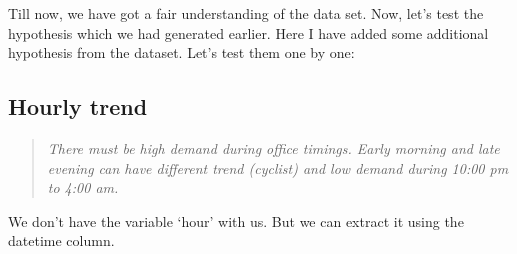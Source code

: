 \documentclass[]{book}
\newenvironment{Shaded}{\begin{snugshade}}{\end{snugshade}}
\newcommand{\CommentTok}[1]{\textcolor[rgb]{0.56,0.35,0.01}{\textit{#1}}}
\newcommand{\DecValTok}[1]{\textcolor[rgb]{0.00,0.00,0.81}{#1}}
\newcommand{\KeywordTok}[1]{\textcolor[rgb]{0.13,0.29,0.53}{\textbf{#1}}}
\newcommand{\NormalTok}[1]{#1}
\newcommand{\OperatorTok}[1]{\textcolor[rgb]{0.81,0.36,0.00}{\textbf{#1}}}
\begin{document}
Till now, we have got a fair understanding of the data set. Now, let's test the hypothesis which we had generated earlier. Here I have added some additional hypothesis from the dataset. Let's test them one by one:

\hypertarget{hourly-trend}{%
\subsection{Hourly trend}\label{hourly-trend}}

\begin{quote}
\emph{There must be high demand during office timings. Early morning and late evening can have different trend (cyclist) and low demand during 10:00 pm to 4:00 am.}
\end{quote}

We don't have the variable `hour' with us. But we can extract it using the datetime column.

\begin{Shaded}
\end{Shaded}

\begin{Shaded}
\end{Shaded}

\begin{Shaded}
\end{Shaded}
\end{document}

